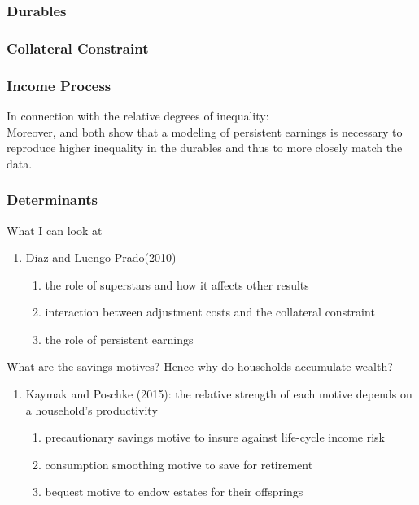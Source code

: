\documentclass[a4paper,12pt]{article}
\begin{document}
\subsubsection{Durables}

\subsubsection{Collateral Constraint}

\subsubsection{Income Process}

In connection with the relative degrees of inequality: \\
Moreover, \cite{hintermaier2010} and \cite{diaz2010} both show that a modeling of persistent earnings is necessary to reproduce higher inequality in the durables and thus to more closely match the data.

\subsubsection{Determinants}
What I can look at
\begin{enumerate}
\item Diaz and Luengo-Prado(2010)
\begin{enumerate}
\item the role of superstars and how it affects other results
\item interaction between adjustment costs and the collateral constraint
\item the role of persistent earnings
\end{enumerate}

\end{enumerate}
What are the savings motives? Hence why do households accumulate wealth?
\begin{enumerate}
\item Kaymak and Poschke (2015): the relative strength of each motive depends on a household's productivity
\begin{enumerate}
\item precautionary savings motive to insure against life-cycle income risk
\item consumption smoothing motive to save for retirement
\item bequest motive to endow estates for their offsprings
\end{enumerate}
\end{enumerate}
\end{document}
